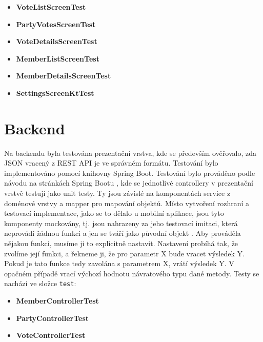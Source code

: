 \begin{itemize}
	\item \textbf{VoteListScreenTest}
	\item \textbf{PartyVotesScreenTest}
	\item \textbf{VoteDetailsScreenTest}
	\item \textbf{MemberListScreenTest}
	\item \textbf{MemberDetailsScreenTest}
	\item \textbf{SettingsScreenKtTest}
\end{itemize}

\section{Backend}
Na backendu byla testována prezentační vrstva, kde se především ověřovalo, zda JSON vracený z REST API je ve správném formátu. Testování bylo implementováno pomocí knihovny Spring Boot. Testování bylo prováděno podle návodu na stránkách Spring Bootu \cite{spring-boot-testing}, kde se jednotlivé controllery v prezentační vrstvě testují jako unit testy. Ty jsou závislé na komponentách service z doménové vrstvy a mapper pro mapování objektů. Místo vytvoření rozhraní a testovací implementace, jako se to dělalo u mobilní aplikace, jsou tyto komponenty mockovány, tj. jsou nahrazeny za jeho testovací imitaci, která neprovádí žádnou funkci a jen se tváří jako původní objekt \cite{mocking}. Aby prováděla nějakou funkci, musíme ji to explicitně nastavit. Nastavení probíhá tak, že zvolíme její funkci, a řekneme ji, že pro parametr X bude vracet výsledek Y. Pokud je tato funkce tedy zavolána s parametrem X, vrátí výsledek Y. V opačném případě vrací výchozí hodnotu návratového typu dané metody. Testy se nachází ve složce \texttt{test}:

\begin{itemize}
	\item \textbf{MemberControllerTest}
	\item \textbf{PartyControllerTest}
	\item \textbf{VoteControllerTest}
\end{itemize}






